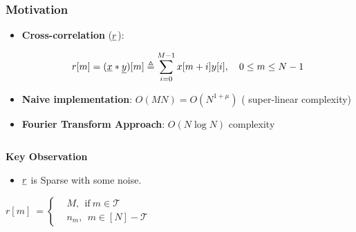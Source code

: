 \begin{frame}\frametitle{Motivation}
	\vspace{-0.4cm}
			\begin{block}{}
			
				\begin{itemize} 
					\item {\bf Cross-correlation} ($\underline{r}$):
					
					\begin{equation}\label{eqn:Rxy_def} \nonumber
					r[m]=(\underline{x}*\underline{y})[m] \triangleq \sum_{i=0}^{M-1} x[m+i] y[i], ~ ~ \ 0 \leq m \leq N-1  
					\end{equation}
					
					
					\item {\bf Naive implementation}: $O(MN) = O(N^{1+\mu})$ ({\color{blue} super-linear} complexity) 
					
					\item 	{\bf Fourier Transform Approach}: $O(N \log N)$ complexity
					
				\end{itemize}
			\end{block}
			
				\begin{columns}
					\column{0.45\columnwidth}
			\begin{block}{\alert{ \bf Key Observation}}
			\vspace{0.2cm}
				\begin{itemize}
					\item $\underline{r}$ is {\color{blue}Sparse} with some noise.
				\end{itemize}
				  
				 \begin{equation} \label{eqn:RXY_sparse}\nonumber
				 r[m] \ = \left\{
				 \begin{array}{ll}
				 &M,~~  \text{if} \ m \in \mathcal{T} \\
				 & n_m,~~ m \in [N]-\mathcal{T}
				 \end{array} 
				 \right.  
				 \end{equation}
			
			\end{block}
										
					\begin{figure}
						\centering
						\scalebox{0.35}{}
					\end{figure}
					
				\end{columns}
				
					
\end{frame}

